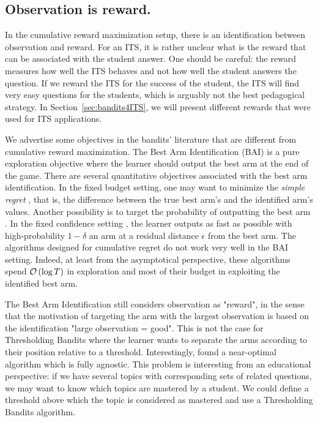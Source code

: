 \subsection{Observation is reward.}
In the cumulative reward maximization setup, there is an identification between observation and reward. For an ITS, it is rather unclear what is the reward that can be associated with the student answer. One should be careful: the reward measures how well the ITS behaves and not how well the student answers the question. If we reward the ITS for the success of the student, the ITS will find very easy questions for the students, which is arguably not the best pedagogical strategy. In Section~\ref{sec:bandits4ITS}, we will present different rewards that were used for ITS applications. 

We advertise some objectives in the bandits' literature that are different from cumulative reward maximization. The Best Arm Identification (BAI) \citep{audibert2010bai, gabillon2012bai} is a pure exploration objective where the learner should output the best arm at the end of the game. There are several quantitative objectives associated with the best arm identification. In the fixed budget setting, one may want to minimize the \emph{simple regret} \citep{audibert2010bai}, that is, the difference between the true best arm's and the identified arm's values. Another possibility is to target the probability of outputting the best arm \citep{carpentier2016tight}. In the fixed confidence setting \citep{garivier2016optimalbai, kaufmann2016complexity}, the learner outputs as fast as possible with high-probability $1- \delta$ an arm at a residual distance $\epsilon$ from the best arm. The algorithms designed for cumulative regret do not work very well in the BAI setting. Indeed, at least from the asymptotical perspective, these algorithms spend $\mathcal{O}\left(\log{T}\right)$ in exploration and most of their budget in exploiting the identified best arm. 

The Best Arm Identification still considers observation as "reward", in the sense that the motivation of targeting the arm with the largest observation is based on the identification "large observation = good". This is not the case for Thresholding Bandits \citep{locatelli2016thresholding, garivier2016thresholding, mukherjee2017thresholding} where the learner wants to separate the arms according to their position relative to a threshold. Interestingly, \citet{locatelli2016thresholding} found a near-optimal algorithm which is fully agnostic. This problem is interesting from an educational perspective: if we have several topics with corresponding sets of related questions, we may want to know which topics are mastered by a student. We could define a threshold above which the topic is considered as mastered and use a Thresholding Bandits algorithm.

